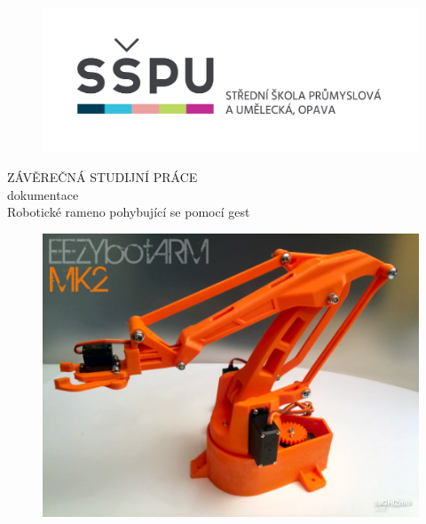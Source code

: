 \documentclass[12pt, a4paper,
twoside,        %
openright
]{report}
\title{\nazevPrace} %
\author{\jmenoAutora} %
\date{\datumOdevzdani} %
\newcommand\nazevPrace{Robotické rameno pohybující se pomocí gest} %
\begin{document}
	
	\pagestyle{empty}
	
	\cleardoublepage


	{\selectfont
	\begin{figure}[h]
		\centering
		\includegraphics[width=0.45\linewidth]{image/logo-skoly.png} 
		
	
		
	\end{figure}

	
	{\selectfont
 
		
		{\bfseries %
			\begin{center}
				\vspace{0.025 \textheight}
				\LARGE{ZÁVĚREČNÁ STUDIJNÍ PRÁCE}\\
				\large{dokumentace}\\
				\vspace{0.075 \textheight}
				\LARGE {\nazevPrace}\\
			\end{center}  
		}%
		
		\begin{figure}[h]
			\centering
			\includegraphics[width=0.8\linewidth]{image/rameno.png} 
			
		\end{figure}
		
}}
\end{document}
